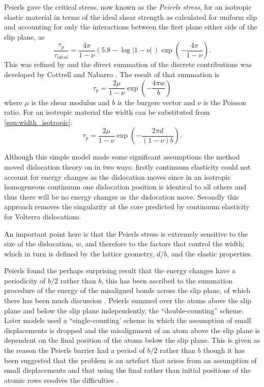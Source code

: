 Peierls gave the critical stress, now known as the \emph{Peierls stress}, for an isotropic elastic material in terms of the ideal shear strength as calculated for uniform slip and accounting for only the interactions between the first plane either side of the slip plane, as
\begin{equation}
\frac{\tau_p}{\tau_{ideal}} = \frac{4 \pi}{1 - \nu} (5.8 - \log|1-\nu|\,) \exp\left(-\frac{4\pi}{1 - \nu}\right).
\end{equation}
This was refined by \citet{Nabarro1947} and the direct summation of the discrete contributions was developed by Cottrell and Nabarro \cite{Cottrell1953}. The result of that summation is
\begin{equation}
\tau_p = \frac{2\mu}{1-\nu} \exp\left( - \frac{4\pi w}{b} \right)
\end{equation}
where $\mu$ is the shear modulus and $b$ is the burgers vector and $\nu$ is the Poisson ratio. For an isotropic material the width can be substituted from \autoref{eqn:width_isotropic}:
\begin{equation}
\tau_p = \frac{2\mu}{1-\nu} \exp\left( - \frac{2\pi d}{(1-\nu)b} \right).
\end{equation}

Although this simple model made some significant assumptions the method moved dislocation theory on in two ways: firstly continuum elasticity could not account for energy changes as the dislocation moves since in an isotropic homogeneous continuum one dislocation position is identical to all others and thus there will be no energy changes as the dislocation move. Secondly this approach removes the singularity at the core predicted by continuum elasticity for Volterra dislocations.


An important point here is that the Peierls stress is extremely sensitive to the size of the dislocation, $w$, and therefore to the factors that control the width; which in turn is defined by the lattice geometry, $d/b$, and the elastic properties.



Peierls found the perhaps surprising result that the energy changes have a periodicity of $b/2$ rather than $b$, this has been ascribed to the summation procedure of the energy of the misaligned bonds across the slip plane, of which there has been much discussion \cite{Hirth_Lothe1982lattice_periodicity,Lu2000peierls}. Peierls summed over the atoms above the slip plane and below the slip plane independently, the ``double-counting'' scheme. Later models used a ``single-counting' scheme in which the assumption of small displacements is dropped and the misalignment of an atom above the slip plane is dependent on the final position of the atoms below the slip plane. This is given as the reason the Peierls barrier had a period of $b/2$ rather than $b$ \cite{Hirth_Lothe1982lattice_periodicity,Lu2000peierls} though it has been suggested that the problem is an artefact that arises from an assumption of small displacements and that using the final rather than initial positions of the atomic rows resolves the difficulties \cite{Huntington1955}. 

